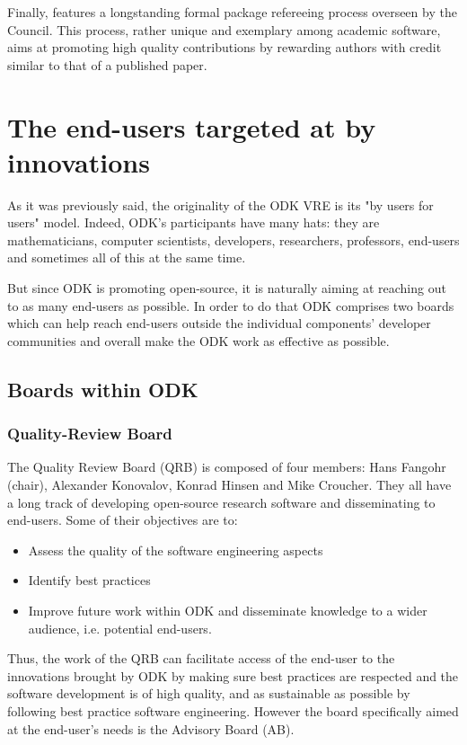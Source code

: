\documentclass{deliverablereport}
\begin{document}
Finally, \GAP features a longstanding formal package refereeing process
overseen by the \GAP Council. This process, rather unique and exemplary
among academic software, aims at promoting high quality contributions
by rewarding authors with credit similar to that of a published paper.

\section{The end-users targeted at by innovations}

As it was previously said, the originality of the ODK VRE is its "by users for
users" model. Indeed, ODK's participants have many hats: they are
mathematicians, computer scientists, developers, researchers, professors,
end-users and sometimes all of this at the same time.

But since ODK is promoting open-source, it is naturally aiming at reaching out
to as many end-users as possible. In order to do that ODK comprises two boards
which can help reach end-users outside the individual components' developer
communities and overall make the ODK work as effective as possible.

\subsection{Boards within ODK}

\subsubsection{Quality-Review Board}

The Quality Review Board (QRB) is composed of four members: Hans
Fangohr (chair), Alexander Konovalov, Konrad Hinsen and Mike
Croucher. They all have a long track of developing open-source research
software and disseminating to end-users. Some of their objectives are
to:

\begin{itemize}
\item{Assess the quality of the software engineering aspects}
\item{Identify best practices}
\item{Improve future work within ODK and disseminate knowledge to a wider audience, i.e. potential end-users.}
\end{itemize}

Thus, the work of the QRB can facilitate access of the end-user to the
innovations brought by ODK by making sure best practices are
respected and the software development is of high quality, and as
sustainable as possible by following best practice software
engineering.
However the
board specifically aimed at the end-user's needs is the Advisory
Board (AB).
\end{document}

